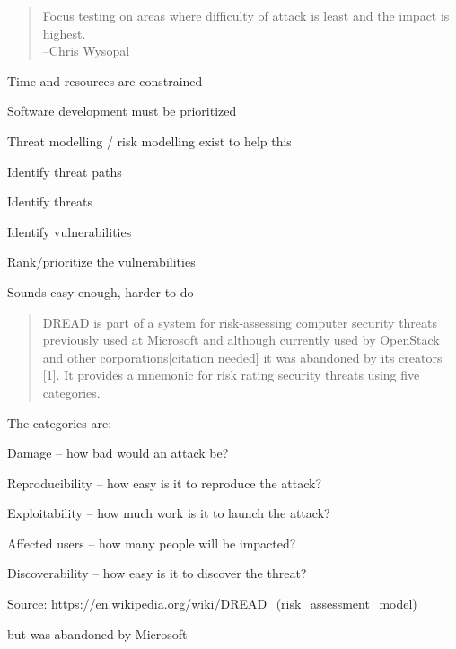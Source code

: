 \documentclass[Screen16to9,17pt]{foils}
\begin{document}

\begin{quote}
Focus testing on areas where difficulty of attack is least and the impact is highest.\\
  --Chris Wysopal
\end{quote}

\begin{list1}
\item Time and resources are constrained
\item Software development must be prioritized
\item Threat modelling / risk modelling exist to help this
\begin{list2}
\item Identify threat paths
\item Identify threats
\item Identify vulnerabilities
\item Rank/prioritize the vulnerabilities
\end{list2}
\end{list1}

Sounds easy enough, harder to do



\begin{quote}
DREAD is part of a system for risk-assessing computer security threats previously used at Microsoft and although currently used by OpenStack and other corporations[citation needed] it was abandoned by its creators [1]. It provides a mnemonic for risk rating security threats using five categories.
\end{quote}
The categories are:

\begin{list2}
\item Damage – how bad would an attack be?
\item Reproducibility – how easy is it to reproduce the attack?
\item Exploitability – how much work is it to launch the attack?
\item Affected users – how many people will be impacted?
\item Discoverability – how easy is it to discover the threat?
\end{list2}
Source:
\url{https://en.wikipedia.org/wiki/DREAD_(risk_assessment_model)}

but was abandoned by Microsoft

\end{document}
